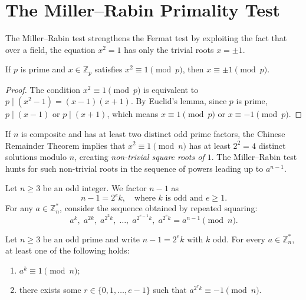 
\section*{The Miller--Rabin Primality Test}

The Miller--Rabin test strengthens the Fermat test by exploiting the fact that over a field, the equation \(x^2 = 1\) has only the trivial roots \(x = \pm 1\).

\begin{lemma}\label{lem:roots-of-unity}
    If \(p\) is prime and \(x \in \mathbb{Z}_p\) satisfies \(x^2 \equiv 1 \pmod{p}\), then \(x \equiv \pm 1 \pmod{p}\).
\end{lemma}

\begin{proof}
    The condition \(x^2 \equiv 1 \pmod{p}\) is equivalent to \(p \mid (x^2 - 1) = (x - 1)(x + 1)\).
    By Euclid's lemma, since \(p\) is prime, \(p \mid (x - 1)\) or \(p \mid (x + 1)\), which means \(x \equiv 1 \pmod{p}\) or \(x \equiv -1 \pmod{p}\).
\end{proof}

If \(n\) is composite and has at least two distinct odd prime factors, the Chinese Remainder Theorem implies that \(x^2 \equiv 1 \pmod{n}\) has at least \(2^2 = 4\) distinct solutions modulo \(n\), creating \emph{non-trivial square roots of \(1\)}.
The Miller--Rabin test hunts for such non-trivial roots in the sequence of powers leading up to \(a^{n-1}\).

Let \(n \geq 3\) be an odd integer. We factor \(n - 1\) as
\[
    n - 1 = 2^e k, \quad \text{where \(k\) is odd and \(e \geq 1\)}.
\]
For any \(a \in \mathbb{Z}_n^*\), consider the sequence obtained by repeated squaring:
\[
    a^k, \; a^{2k}, \; a^{2^2 k}, \; \dots, \; a^{2^{e-1} k}, \; a^{2^e k} = a^{n-1} \pmod{n}.
\]

\begin{theorem}\label{thm:miller-condition}
    Let \(n \geq 3\) be an odd prime and write \(n - 1 = 2^e k\) with \(k\) odd.
    For every \(a \in \mathbb{Z}_n^*\), at least one of the following holds:
    \begin{enumerate}[label=\textup{(\roman*)}]
        \item \(a^k \equiv 1 \pmod{n}\);
        \item there exists some \(r \in \{0, 1, \dots, e-1\}\) such that \(a^{2^r k} \equiv -1 \pmod{n}\).
    \end{enumerate}
\end{theorem}

